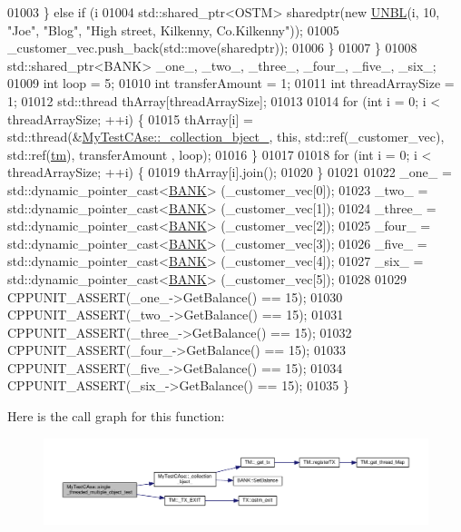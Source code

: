 \begin{DoxyCode}
01003         \} \textcolor{keywordflow}{else} \textcolor{keywordflow}{if} (i %
01004             std::shared\_ptr<OSTM> sharedptr(\textcolor{keyword}{new} \hyperlink{class_u_n_b_l}{UNBL}(i, 10, \textcolor{stringliteral}{"Joe"}, \textcolor{stringliteral}{"Blog"}, \textcolor{stringliteral}{"High street, Kilkenny,
       Co.Kilkenny"}));
01005             \_customer\_vec.push\_back(std::move(sharedptr));
01006         \}
01007     \}
01008     std::shared\_ptr<BANK> \_one\_, \_two\_, \_three\_, \_four\_, \_five\_, \_six\_;
01009     \textcolor{keywordtype}{int} loop = 5;
01010     \textcolor{keywordtype}{int} transferAmount = 1;
01011     \textcolor{keywordtype}{int} threadArraySize = 1; 
01012     std::thread thArray[threadArraySize];
01013 
01014     \textcolor{keywordflow}{for} (\textcolor{keywordtype}{int} i = 0; i < threadArraySize; ++i) \{ 
01015         thArray[i] = std::thread(&\hyperlink{class_my_test_c_ase_a9ec1ddfc6e7f727446e1a8355086c2dd_a9ec1ddfc6e7f727446e1a8355086c2dd}{MyTestCAse::\_collection\_bject\_}, \textcolor{keyword}{this}, 
      std::ref(\_customer\_vec),  std::ref(\hyperlink{class_my_test_c_ase_a422e6e5d4ddedea384be96031c89b72b_a422e6e5d4ddedea384be96031c89b72b}{tm}), transferAmount , loop);
01016     \}
01017     
01018     \textcolor{keywordflow}{for} (\textcolor{keywordtype}{int} i = 0; i < threadArraySize; ++i) \{
01019         thArray[i].join();
01020     \}
01021     
01022     \_one\_ = std::dynamic\_pointer\_cast<\hyperlink{class_b_a_n_k}{BANK}> (\_customer\_vec[0]);
01023     \_two\_ = std::dynamic\_pointer\_cast<\hyperlink{class_b_a_n_k}{BANK}> (\_customer\_vec[1]);
01024     \_three\_ = std::dynamic\_pointer\_cast<\hyperlink{class_b_a_n_k}{BANK}> (\_customer\_vec[2]);
01025     \_four\_ = std::dynamic\_pointer\_cast<\hyperlink{class_b_a_n_k}{BANK}> (\_customer\_vec[3]);
01026     \_five\_ = std::dynamic\_pointer\_cast<\hyperlink{class_b_a_n_k}{BANK}> (\_customer\_vec[4]);
01027     \_six\_ = std::dynamic\_pointer\_cast<\hyperlink{class_b_a_n_k}{BANK}> (\_customer\_vec[5]);
01028     
01029     CPPUNIT\_ASSERT(\_one\_->GetBalance() == 15);
01030     CPPUNIT\_ASSERT(\_two\_->GetBalance() == 15);
01031     CPPUNIT\_ASSERT(\_three\_->GetBalance() == 15);
01032     CPPUNIT\_ASSERT(\_four\_->GetBalance() == 15);
01033     CPPUNIT\_ASSERT(\_five\_->GetBalance() == 15);
01034     CPPUNIT\_ASSERT(\_six\_->GetBalance() == 15);
01035 \}
\end{DoxyCode}


Here is the call graph for this function\+:
\nopagebreak
\begin{figure}[H]
\begin{center}
\leavevmode
\includegraphics[width=350pt]{class_my_test_c_ase_a2f75b781b07bdbc3649c10d6845cb3cc_a2f75b781b07bdbc3649c10d6845cb3cc_cgraph}
\end{center}
\end{figure}


